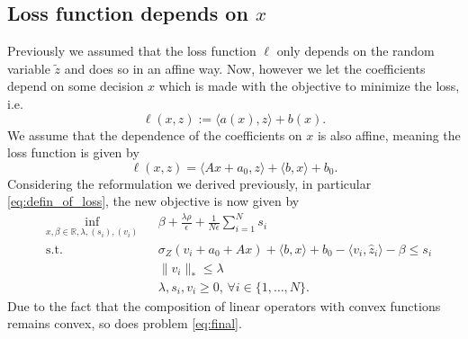 \documentclass{scrartcl}
\newcommand{\R}{\mathbb{R}}
\begin{document}
\subsection*{Loss function depends on $x$}
Previously we assumed that the loss function $\ell$ only depends on the random
variable $\tilde{z}$ and does so in an affine way. Now, however we let the
coefficients depend on some decision $x$ which is made with the objective to
minimize the loss, i.e.
\begin{equation*}
 \ell(x,z) := \langle {a(x), z} \rangle + b(x).
\end{equation*}
We assume that the dependence of the coefficients on $x$ is also affine, meaning
the loss function is given by
\begin{equation*}
 \ell(x,z) = \langle {Ax + a_0, z} \rangle + \langle {b,x} \rangle + b_0.
\end{equation*}
Considering the reformulation we derived previously, in particular
\eqref{eq:defin_of_loss}, the new objective is now given by
\begin{equation}
  \label{eq:final}
  \begin{aligned}
    & \inf_{x, \beta \in \R, \lambda, (s_i), (v_i)} & & \beta + \frac{\lambda\rho}{\epsilon} + \frac{1}{N\epsilon} \sum_{i=1}^N s_i \\
    & \text{s.t.} & & \sigma_Z(v_i + a_0 + Ax ) + \langle {b,x} \rangle + b_0 - \langle v_i, \hat{z}_i \rangle -\beta \le s_i \\
     & & & \lVert {v_i} \rVert_* \le \lambda \\
     & & & \lambda, s_i, v_i \geq 0, \, \forall i \in \{1,\dots,N\}.  
  \end{aligned}
\end{equation}
Due to the fact that the composition of linear operators with convex functions
remains convex, so does problem \eqref{eq:final}.








\end{document}
